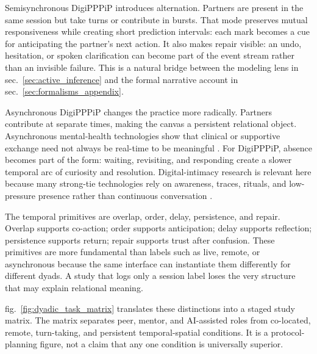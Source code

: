 \documentclass[
  english,
]{article}
\begin{document}
Semisynchronous DigiPPPiP introduces alternation. Partners are present
in the same session but take turns or contribute in bursts. That mode
preserves mutual responsiveness while creating short prediction
intervals: each mark becomes a cue for anticipating the partner's next
action. It also makes repair visible: an undo, hesitation, or spoken
clarification can become part of the event stream rather than an
invisible failure. This is a natural bridge between the modeling lens in
sec.~\ref{sec:active_inference} and the formal narrative account in
sec.~\ref{sec:formalisms_appendix}.

Asynchronous DigiPPPiP changes the practice more radically. Partners
contribute at separate times, making the canvas a persistent relational
object. Asynchronous mental-health technologies show that clinical or
supportive exchange need not always be real-time to be meaningful
\citep{lagera2023asynchronous}. For DigiPPPiP, absence becomes part of
the form: waiting, revisiting, and responding create a slower temporal
arc of curiosity and resolution. Digital-intimacy research is relevant
here because many strong-tie technologies rely on awareness, traces,
rituals, and low-pressure presence rather than continuous conversation
\citep{hassenzahl2012love, vetere2005mediating}.

The temporal primitives are overlap, order, delay, persistence, and
repair. Overlap supports co-action; order supports anticipation; delay
supports reflection; persistence supports return; repair supports trust
after confusion. These primitives are more fundamental than labels such
as live, remote, or asynchronous because the same interface can
instantiate them differently for different dyads. A study that logs only
a session label loses the very structure that may explain relational
meaning.

fig.~\ref{fig:dyadic_task_matrix} translates these distinctions into a
staged study matrix. The matrix separates peer, mentor, and AI-assisted
roles from co-located, remote, turn-taking, and persistent
temporal-spatial conditions. It is a protocol-planning figure, not a
claim that any one condition is universally superior.
\end{document}
